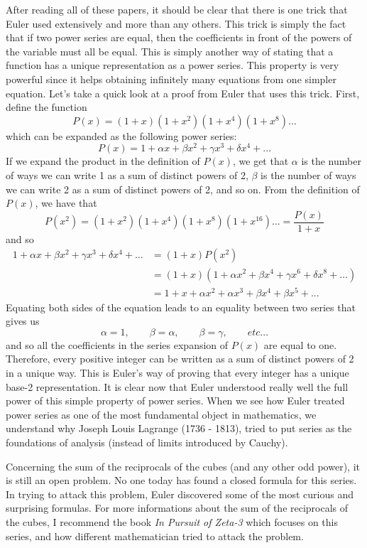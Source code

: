 After reading all of these papers, it should be clear that there is one trick that Euler used extensively and more than any others. This trick is simply the fact that if two power series are equal, then the coefficients in front of the powers of the variable must all be equal. This is simply another way of stating that a function has a unique representation as a power series. This property is very powerful since it helps obtaining infinitely many equations from one simpler equation. Let's take a quick look at a proof from Euler that uses this trick. First, define the function
$$P(x) = (1 + x)(1 + x^2)(1 + x^4)(1 + x^8)\dots $$
which can be expanded as the following power series: 
$$P(x) = 1 + \alpha x + \beta x^2 + \gamma x^3 + \delta x^4 + \dots$$
If we expand the product in the definition of $P(x)$, we get that $\alpha$ is the number of ways we can write 1 as a sum of distinct powers of 2, $\beta$ is the number of ways we can write 2 as a sum of distinct powers of 2, and so on. From the definition of $P(x)$, we have that
$$P(x^2) = (1 + x^2)(1 + x^4)(1 + x^8)(1 + x^{16})... = \frac{P(x)}{1+x}$$
and so
\begin{align*}
    1 + \alpha x + \beta x^2 + \gamma x^3 + \delta x^4 + \dots &= (1 +x)P(x^2) \\
    &= (1 + x)(1 + \alpha x^2 + \beta x^4 + \gamma x^6 + \delta x^8 + \dots) \\
    &= 1 + x + \alpha x^2 + \alpha x^3 + \beta x^4 + \beta x^5 + ...  
\end{align*}
Equating both sides of the equation leads to an equality between two series that gives us
$$\alpha = 1, \qquad \beta = \alpha, \qquad \beta = \gamma, \qquad etc...$$
and so all the coefficients in the series expansion of $P(x)$ are equal to one. Therefore, every positive integer can be written as a sum of distinct powers of 2 in a unique way. This is Euler's way of proving that every integer has a unique base-2 representation. It is clear now that Euler understood really well the full power of this simple property of power series. When we see how Euler treated power series as one of the most fundamental object in mathematics, we understand why Joseph Louis Lagrange (1736 - 1813), tried to put series as the foundations of analysis (instead of limits introduced by Cauchy).

Concerning the sum of the reciprocals of the cubes (and any other odd power), it is still an open problem. No one today has found a closed formula for this series. In trying to attack this problem, Euler discovered some of the most curious and surprising formulas. For more informations about the sum of the reciprocals of the cubes, I recommend the book \textit{In Pursuit of Zeta-3} \cite{pursuitZeta3} which focuses on this series, and how different mathematician tried to attack the problem.

